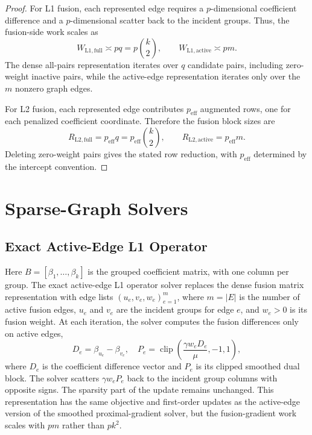 \documentclass[twoside,11pt]{article}
\DeclareMathOperator{\clip}{clip}
\begin{document}
\begin{proof}
For L1 fusion, each represented edge requires a $p$-dimensional coefficient difference and a $p$-dimensional scatter back to the incident groups. 
Thus, the fusion-side work scales as
\[
  W_{\mathrm{L1,full}} \asymp p q
  =
  p\binom{k}{2},
  \qquad
  W_{\mathrm{L1,active}} \asymp p m .
\]
The dense all-pairs representation iterates over $q$ candidate pairs, including zero-weight inactive pairs, while the active-edge representation iterates only over the $m$ nonzero graph edges.

For L2 fusion, each represented edge contributes $p_{\mathrm{eff}}$ augmented rows, one for each penalized coefficient coordinate. 
Therefore the fusion block sizes are
\[
  R_{\mathrm{L2,full}} = p_{\mathrm{eff}} q
  =
  p_{\mathrm{eff}}\binom{k}{2},
  \qquad
  R_{\mathrm{L2,active}} = p_{\mathrm{eff}} m .
\]
Deleting zero-weight pairs gives the stated row reduction, with $p_{\mathrm{eff}}$ determined by the intercept convention.
\end{proof}

\section{Sparse-Graph Solvers}
\label{sec:solvers}

\subsection{Exact Active-Edge L1 Operator}
Here $B=[\beta_1,\ldots,\beta_k]$ is the grouped coefficient matrix, with one column per group. 
The exact active-edge L1 operator solver replaces the dense fusion matrix representation with edge lists $(u_e,v_e,w_e)_{e=1}^m$, where $m=|E|$ is the number of active fusion edges, $u_e$ and $v_e$ are the incident groups for edge $e$, and $w_e>0$ is its fusion weight. 
At each iteration, the solver computes the fusion differences only on active edges,
\[
  D_e = \beta_{u_e}-\beta_{v_e},
  \quad
  P_e = \clip\left(\frac{\gamma w_e D_e}{\mu},-1,1\right),
\]
where $D_e$ is the coefficient difference vector and $P_e$ is its clipped smoothed dual block. 
The solver scatters $\gamma w_e P_e$ back to the incident group columns with opposite signs. 
The sparsity part of the update remains unchanged. 
This representation has the same objective and first-order updates as the active-edge version of the smoothed proximal-gradient solver, but the fusion-gradient work scales with $pm$ rather than $pk^2$.
\end{document}
